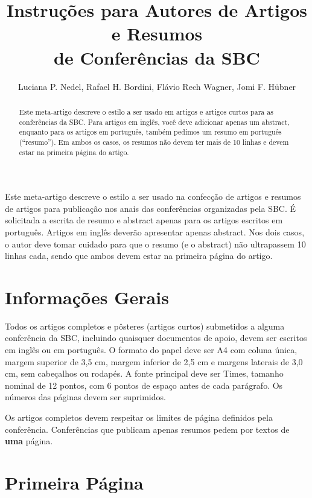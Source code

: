 \documentclass[12pt]{article}
\title{Instruções para Autores de Artigos e Resumos\\ de Conferências da SBC}
\author{Luciana P. Nedel\inst{1}, Rafael H. Bordini\inst{2}, Flávio Rech
  Wagner\inst{1}, Jomi F. Hübner\inst{3} }
\begin{document}
 

\maketitle

\begin{resumo} 
  Este meta-artigo descreve o estilo a ser usado na confecção de artigos e
  resumos de artigos para publicação nos anais das conferências organizadas
  pela SBC. É solicitada a escrita de resumo e abstract apenas para os artigos
  escritos em português. Artigos em inglês deverão apresentar apenas abstract.
  Nos dois casos, o autor deve tomar cuidado para que o resumo (e o abstract)
  não ultrapassem 10 linhas cada, sendo que ambos devem estar na primeira
  página do artigo.
\end{resumo}

     

\begin{abstract}
  Este meta-artigo descreve o estilo a ser usado em artigos e artigos curtos
  para as conferências da SBC. Para artigos em inglês, você deve adicionar apenas um
  abstract, enquanto para os artigos em português, também pedimos um resumo em
  português (``resumo''). Em ambos os casos, os resumos não devem ter mais de
  10 linhas e devem estar na primeira página do artigo.
\end{abstract}


\section{Informações Gerais}

Todos os artigos completos e pôsteres (artigos curtos) submetidos a alguma conferência da SBC,
incluindo quaisquer documentos de apoio, devem ser escritos em inglês ou em
português. O formato do papel deve ser A4 com coluna única, margem superior de 3,5 cm, 
margem inferior de 2,5 cm e margens laterais de 3,0 cm, sem
cabeçalhos ou rodapés. A fonte principal deve ser Times, tamanho nominal de 12
pontos, com 6 pontos de espaço antes de cada parágrafo. Os números das páginas
devem ser suprimidos.

Os artigos completos devem respeitar os limites de página definidos pela conferência.
Conferências que publicam apenas resumos pedem por textos de \textbf{uma} página.

\section{Primeira Página} \label{sec:firstpage}
\end{document}
